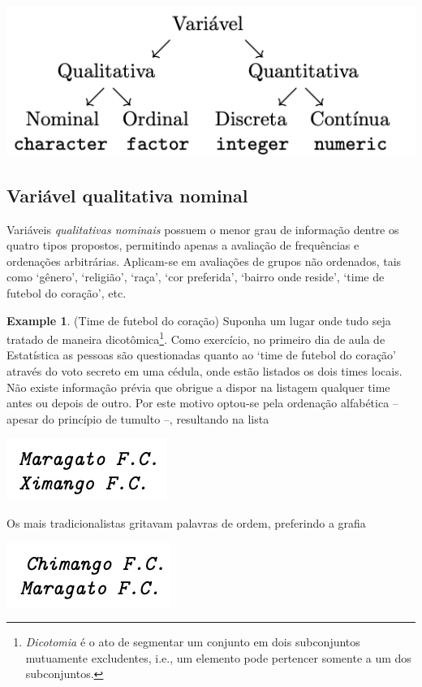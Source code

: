 \documentclass[
]{book}
\theoremstyle{definition}
\theoremstyle{definition}
\newtheorem{example}{Example}[chapter]
\theoremstyle{definition}
\theoremstyle{remark}
\begin{document}
\includegraphics{img/variavel.png}

\hypertarget{variavel-qualitativa-nominal}{%
\subsection{Variável qualitativa nominal}\label{variavel-qualitativa-nominal}}

Variáveis \emph{qualitativas nominais} possuem o menor grau de informação dentre os quatro tipos propostos, permitindo apenas a avaliação de frequências e ordenações arbitrárias. Aplicam-se em avaliações de grupos não ordenados, tais como `gênero', `religião', `raça', `cor preferida', `bairro onde reside', `time de futebol do coração', etc.

\begin{example}
\protect\hypertarget{exm:var-nominal}{}{\label{exm:var-nominal} }(Time de futebol do coração) Suponha um lugar onde tudo seja tratado de maneira dicotômica\footnote{\textit{Dicotomia} é o ato de segmentar um conjunto em dois subconjuntos mutuamente excludentes, i.e., um elemento pode pertencer somente a um dos subconjuntos.}. Como exercício, no primeiro dia de aula de Estatística as pessoas são questionadas quanto ao `time de futebol do coração' através do voto secreto em uma cédula, onde estão listados os dois times locais. Não existe informação prévia que obrigue a dispor na listagem qualquer time antes ou depois de outro. Por este motivo optou-se pela ordenação alfabética -- apesar do princípio de tumulto --, resultando na lista

\includegraphics{img/maragato_ximango.png}

Os mais tradicionalistas gritavam palavras de ordem, preferindo a grafia

\includegraphics{img/chimango_maragato.png}
\end{example}
\end{document}
